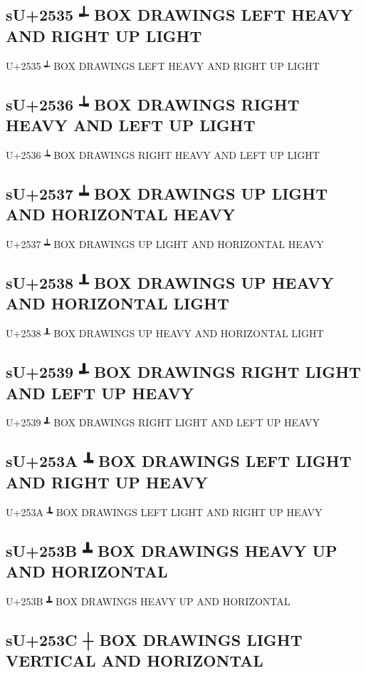 \subsection{sU+2535 ┵ BOX DRAWINGS LEFT HEAVY AND RIGHT UP LIGHT}

U+2535 ┵ BOX DRAWINGS LEFT HEAVY AND RIGHT UP LIGHT

\subsection{sU+2536 ┶ BOX DRAWINGS RIGHT HEAVY AND LEFT UP LIGHT}

U+2536 ┶ BOX DRAWINGS RIGHT HEAVY AND LEFT UP LIGHT

\subsection{sU+2537 ┷ BOX DRAWINGS UP LIGHT AND HORIZONTAL HEAVY}

U+2537 ┷ BOX DRAWINGS UP LIGHT AND HORIZONTAL HEAVY

\subsection{sU+2538 ┸ BOX DRAWINGS UP HEAVY AND HORIZONTAL LIGHT}

U+2538 ┸ BOX DRAWINGS UP HEAVY AND HORIZONTAL LIGHT

\subsection{sU+2539 ┹ BOX DRAWINGS RIGHT LIGHT AND LEFT UP HEAVY}

U+2539 ┹ BOX DRAWINGS RIGHT LIGHT AND LEFT UP HEAVY

\subsection{sU+253A ┺ BOX DRAWINGS LEFT LIGHT AND RIGHT UP HEAVY}

U+253A ┺ BOX DRAWINGS LEFT LIGHT AND RIGHT UP HEAVY

\subsection{sU+253B ┻ BOX DRAWINGS HEAVY UP AND HORIZONTAL}

U+253B ┻ BOX DRAWINGS HEAVY UP AND HORIZONTAL

\subsection{sU+253C ┼ BOX DRAWINGS LIGHT VERTICAL AND HORIZONTAL}

